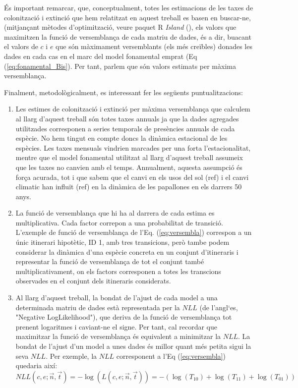 \documentclass{article}
\begin{document}
\'Es important remarcar, que, conceptualment, totes les estimacions de les taxes de colonitzaci\'o i extinci\'o que hem relatitzat en aquest treball es basen en buscar-ne, (mitjan\c{c}ant m\`etodes d'optimitzaci\'o, veure paquet R {\it Island} (\cite{Alonso2015,Ontiveros2019}), els valors que maximitzen la funci\'o de versemblan\c{c}a de cada matriu de dades, \'es a dir, buacant el valors de $c$ i $e$ que s\'on m\`aximament versemblants (els m\'es cre\"ibles) donades les dades en cada cas en el marc del model fonamental emprat (Eq (\ref{eq:fonamental_Bis}). Per tant, parlem que s\'on valors estimats per m\`axima versemblan\c{c}a. 
\smallskip

Finalment, metodol\`ogicalment, es interessant fer les seg\"uents puntualitzacions:
\begin{enumerate}
    \item Les estimes de colonitzaci\'o i extinci\'o per m\`axima versemblan\c{c}a que calculem al llarg d'aquest treball s\'on totes taxes annuals ja que la dades agregades utilitzades corresponen a series temporals de pres\`encies annuals de cada esp\`ecie. No hem tingut en compte doncs la din\`amica estacional de les esp\`ecies. Les taxes mensuals vindrien marcades per una forta l'estacionalitat, mentre que el model fonamental utilitzat al llarg d'aquest treball assumeix que les taxes no canvien amb el temps. Annualment, aquesta assumpci\'o \'es for\c{c}a acurada, tot i que sabem que el canvi en els usos del sol (ref) i el canvi climatic han influ\"it (ref) en la din\`amica de les papallones en els darrers 50 anys.
    
    \item La funci\'o de versemblan\c{c}a que hi ha al darrera de cada estima es multiplicativa. Cada factor correpon a una probabilitat de transici\'o. L'exemple de funci\'o de versemblan\c{c}a de l'Eq. (\ref{eq:versembla})
    correspon a un \'unic itinerari hipot\`etic, ID 1, amb tres transicions, per\`o tambe podem considerar la din\`amica d'una esp\`ecie concreta en un conjunt d'itineraris i representar la funci\'o de versemblan\c{c}a de tot el conjunt tamb\'e multiplicativament, on els factors corresponen a totes les transcions observades en el conjunt dels itineraris considerats.  
    
    \item Al llarg d'aquest treball, la bondat de l'ajust de cada model a una determinada matriu de dades est\`a representada per la $NLL$ (de l'angl`es, "Negative LogLikelihood"), que deriva de la funci\'o de versemblan\c{c}a tot prenent logaritmes i caviant-ne el signe. Per tant, cal recordar que maximitzar la funci\'o de versemblan\c{c}a \'es equivalent a minimitzar la $NLL$. La bondat de l'ajust d'un model a unes dades \'es millor quant m\'es petita sigui la seva $NLL$. Per exemple, la $NLL$ corresponent a l'Eq (\ref{eq:versembla}) quedaria aix\'i: 
    \begin{equation}
        NLL(c, e; \vec{n}, \vec{t}) = -\log(L(c, e; \vec{n}, \vec{t})) = - \left(\log(T_{10}) + \log(T_{11}) + \log(T_{01})\right) 
    \end{equation}
    

\end{enumerate}
\end{document}

